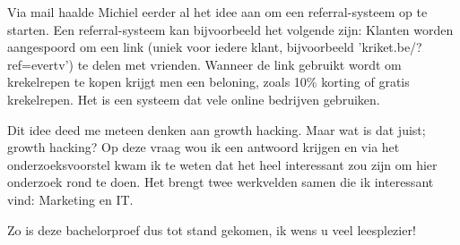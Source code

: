 Via mail haalde Michiel eerder al het idee aan om een referral-systeem op te starten. Een referral-systeem kan bijvoorbeeld het volgende zijn: Klanten worden aangespoord om een link (uniek voor iedere klant, bijvoorbeeld 'kriket.be/?ref=evertv') te delen met vrienden. Wanneer de link gebruikt wordt om krekelrepen te kopen krijgt men een beloning, zoals 10\% korting of gratis krekelrepen. Het is een systeem dat vele online bedrijven gebruiken. 

Dit idee deed me meteen denken aan growth hacking. Maar wat is dat juist; growth hacking? Op deze vraag wou ik een antwoord krijgen en via het onderzoeksvoorstel kwam ik te weten dat het heel interessant zou zijn om hier onderzoek rond te doen. Het brengt twee werkvelden samen die ik interessant vind: Marketing en IT.

Zo is deze bachelorproef dus tot stand gekomen, ik wens u veel leesplezier!